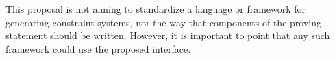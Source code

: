 \documentclass[a4paper,11pt]{article}
\begin{document}
		This proposal is not aiming to standardize a language or framework for generating constraint systems, nor the way that components of the proving statement should be written. However, it is important to point that any such framework could use the proposed interface.
		
		

		
		
	
\end{document}
